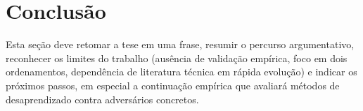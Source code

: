 \section{Conclusão}


Esta seção deve retomar a tese em uma frase, resumir o percurso argumentativo,
reconhecer os limites do trabalho (ausência de validação empírica, foco em dois
ordenamentos, dependência de literatura técnica em rápida evolução) e indicar
os próximos passos, em especial a continuação empírica que avaliará métodos
de desaprendizado contra adversários concretos.

